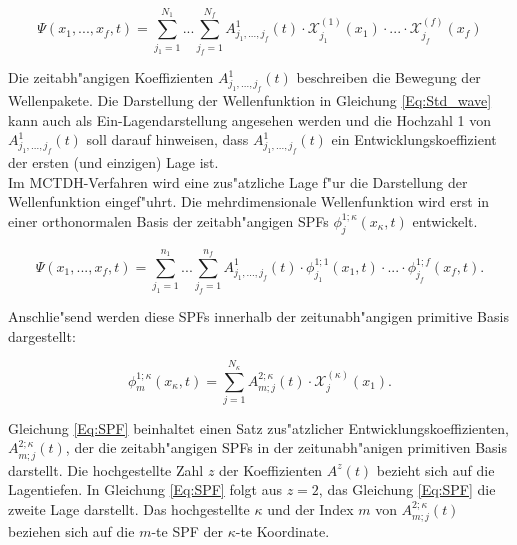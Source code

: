  \begin{equation}
 \Psi(x_{1},..., x_{f}, t)=\sum^{N_{1}}_{j_{1}=1} ... \sum^{N_{f}}_{j_{f}=1} A^{1}_{j_{1}, ..., j_{f}}(t)\cdot \mathcal{X}^{(1)}_{j_{1}}(x_{1}) \cdot ... \cdot \mathcal{X}^{(f)}_{j_{f}}(x_{f})
 \label{Eq:Std_wave}
 \end{equation}

Die zeitabh"angigen Koeffizienten $A^{1}_{j_{1}, ..., j_{f}}(t)$ beschreiben die Bewegung der Wellenpakete.
Die Darstellung der Wellenfunktion in Gleichung  \ref{Eq:Std_wave} kann auch als Ein-Lagendarstellung angesehen werden
und die Hochzahl 1 von $A^{1}_{j_{1}, ..., j_{f}}(t)$ soll darauf hinweisen, dass $A^{1}_{j_{1}, ..., j_{f}}(t)$ ein Entwicklungskoeffizient
der ersten (und einzigen) Lage ist.
\\Im MCTDH-Verfahren wird eine zus"atzliche Lage f"ur die Darstellung der Wellenfunktion eingef"uhrt.
Die mehrdimensionale Wellenfunktion wird erst in einer orthonormalen Basis der zeitabh"angigen SPFs $\phi^{1;\kappa}_{j}(x_{\kappa},t)$
entwickelt.


 \begin{equation}
 \Psi(x_{1},..., x_{f}, t)=\sum^{n_{1}}_{j_{1}=1} ... \sum^{n_{f}}_{j_{f}=1} A^{1}_{j_{1}, ..., j_{f}}(t)
 \cdot \phi^{1;1}_{j_{1}}(x_{1}, t) \cdot ... \cdot \phi^{1;f}_{j_{f}}(x_{f}, t).
 \label{Eq:mctdh_wave}
 \end{equation}

Anschlie"send werden diese SPFs innerhalb der zeitunabh"angigen primitive Basis dargestellt: 

\begin{equation}
 \phi^{1;\kappa}_{m} (x_{\kappa}, t)=\sum^{N_{\kappa}}_{j=1} A^{2;\kappa}_{m;j}(t) \cdot \mathcal{X}^{(\kappa)}_{j}(x_{1}).
 \label{Eq:SPF}
 \end{equation}

Gleichung \ref{Eq:SPF} beinhaltet einen Satz zus"atzlicher Entwicklungskoeffizienten, $ A^{2;\kappa}_{m;j}(t) $, der die zeitabh"angigen SPFs
in der zeitunabh"anigen primitiven Basis darstellt.
Die hochgestellte Zahl $z$ der Koeffizienten $A^{z}(t)$ bezieht sich auf die Lagentiefen.
In Gleichung \ref{Eq:SPF} folgt aus $z=2$, das Gleichung \ref{Eq:SPF} die zweite Lage darstellt.
Das hochgestellte $\kappa$ und der Index $m$ von $A^{2;\kappa}_{m;j}(t)$ beziehen sich auf die $m$-te SPF der $\kappa$-te Koordinate.

